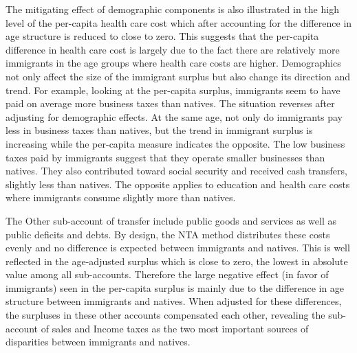 \vspace{0.7em}\par
The mitigating effect of demographic components is also illustrated in the high level of the per-capita health care cost which after accounting for the difference in age structure is reduced to close to zero.
This suggests that the per-capita difference in health care cost is largely due to the fact there are relatively more immigrants in the age groups where health care costs are higher.
Demographics not only affect the size of the immigrant surplus but also change its direction and trend.
For example, looking at the per-capita surplus, immigrants seem to have paid on average more business taxes than natives.
The situation reverses after adjusting for demographic effects.
At the same age, not only do immigrants pay less in business taxes than natives, but the trend in immigrant surplus is increasing while the per-capita measure indicates the opposite.
The low business taxes paid by immigrants suggest that they operate smaller businesses than natives.
They also contributed toward social security and received cash transfers, slightly less than natives.
The opposite applies to education and health care costs where immigrants consume slightly more than natives.

\vspace{0.7em}\par
The Other sub-account of transfer include public goods and services as well as public deficits and debts.
By design, the NTA method distributes these costs evenly and no difference is expected between immigrants and natives.
This is well reflected in the age-adjusted surplus which is close to zero, the lowest in absolute value among all sub-accounts.
Therefore the large negative effect (in favor of immigrants) seen in the per-capita surplus is mainly due to the difference in age structure between immigrants and natives.
When adjusted for these differences, the surpluses in these other accounts compensated each other, revealing the sub-account of sales and Income taxes as the two most important sources of disparities between immigrants and natives.

